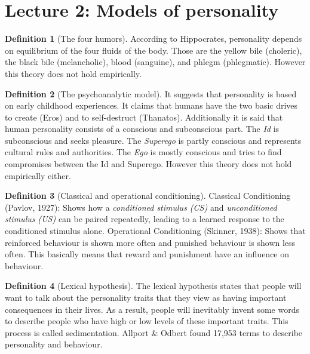 \documentclass{article}
\theoremstyle{definition}
\newtheorem{definition}{Definition}
\theoremstyle{Solution}
\begin{document}
\section{Lecture 2: Models of personality}

\begin{definition}[The four humors]
According to Hippocrates, personality depends on equilibrium of the four fluids of the body. Those are the yellow bile (choleric), the black bile (melancholic), blood (sanguine), and phlegm (phlegmatic). However this theory does not hold empirically.
\end{definition}

\begin{definition}[The psychoanalytic model]
It suggests that personality is based on early childhood experiences. It claims that humans have the two basic drives to create (Eros) and to self-destruct (Thanatos). Additionally it is said that human personality consists of a conscious and subconscious part. The \textit{Id} is subconscious and seeks pleasure. The \textit{Superego} is partly conscious and represents cultural rules and authorities. The \textit{Ego} is mostly conscious and tries to find compromises between the Id and Superego. However this theory does not hold empirically either.
\end{definition}

\begin{definition}[Classical and operational conditioning]
Classical Conditioning (Pavlov, 1927): Shows how a \textit{conditioned stimulus (CS)} and \textit{unconditioned stimulus (US)} can be paired repeatedly, leading to a learned response to the conditioned stimulus alone. Operational Conditioning (Skinner, 1938): Shows that reinforced behaviour is shown more often and punished behaviour is shown less often. This basically means that reward and punishment have an influence on behaviour.
\end{definition}

\begin{definition}[Lexical hypothesis]
The lexical hypothesis states that people will want to talk about the personality traits that they view as having important consequences in their lives. As a result, people will inevitably invent some words to describe people who have high or low levels of these important traits. This process is called sedimentation. Allport \& Odbert found 17,953 terms to describe personality and behaviour.
\end{definition}
\end{document}
